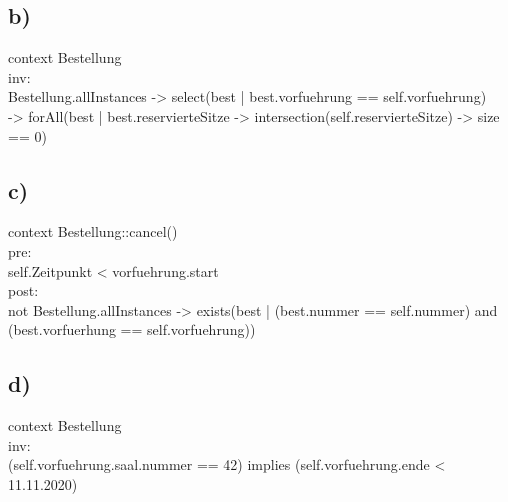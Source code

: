 \subsection*{b)}
context Bestellung \\ \indent
\quad inv: \\ \indent
\qquad Bestellung.allInstances -> select(best | best.vorfuehrung == self.vorfuehrung)\\ \indent \qquad -> forAll(best | best.reservierteSitze -> intersection(self.reservierteSitze) -> size == 0)
\newpage
\subsection*{c)}
context Bestellung::cancel()\\ \indent
\quad pre:\\ \indent
\qquad self.Zeitpunkt < vorfuehrung.start\\ \indent
\quad post: \\ \indent
\qquad not \quad Bestellung.allInstances -> exists(best | (best.nummer == self.nummer) and (best.vorfuerhung == self.vorfuehrung))

\subsection*{d)}
context Bestellung\\ \indent
\quad inv: \\ \indent
\qquad  (self.vorfuehrung.saal.nummer == 42) implies (self.vorfuehrung.ende < 11.11.2020)

